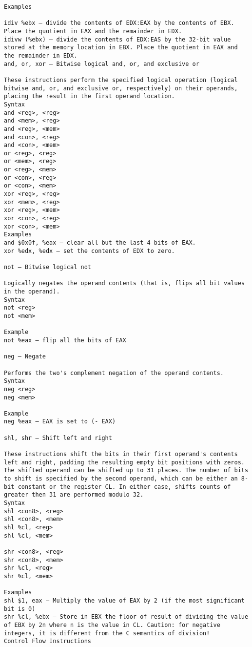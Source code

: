 \documentclass[10pt]{article}
\begin{document}
{\begin{multicols*}{5}
\begin{lstlisting}[breaklines=true,columns=fullflexible]
Examples

idiv %ebx — divide the contents of EDX:EAX by the contents of EBX. Place the quotient in EAX and the remainder in EDX.
idivw (%ebx) — divide the contents of EDX:EAS by the 32-bit value stored at the memory location in EBX. Place the quotient in EAX and the remainder in EDX.
and, or, xor — Bitwise logical and, or, and exclusive or

These instructions perform the specified logical operation (logical bitwise and, or, and exclusive or, respectively) on their operands, placing the result in the first operand location.
Syntax
and <reg>, <reg>
and <mem>, <reg>
and <reg>, <mem>
and <con>, <reg>
and <con>, <mem>
or <reg>, <reg>
or <mem>, <reg>
or <reg>, <mem>
or <con>, <reg>
or <con>, <mem>
xor <reg>, <reg>
xor <mem>, <reg>
xor <reg>, <mem>
xor <con>, <reg>
xor <con>, <mem>
Examples
and $0x0f, %eax — clear all but the last 4 bits of EAX.
xor %edx, %edx — set the contents of EDX to zero.

not — Bitwise logical not

Logically negates the operand contents (that is, flips all bit values in the operand).
Syntax
not <reg>
not <mem>

Example
not %eax — flip all the bits of EAX

neg — Negate

Performs the two's complement negation of the operand contents.
Syntax
neg <reg>
neg <mem>

Example
neg %eax — EAX is set to (- EAX)

shl, shr — Shift left and right

These instructions shift the bits in their first operand's contents left and right, padding the resulting empty bit positions with zeros. The shifted operand can be shifted up to 31 places. The number of bits to shift is specified by the second operand, which can be either an 8-bit constant or the register CL. In either case, shifts counts of greater then 31 are performed modulo 32.
Syntax
shl <con8>, <reg>
shl <con8>, <mem>
shl %cl, <reg>
shl %cl, <mem>

shr <con8>, <reg>
shr <con8>, <mem>
shr %cl, <reg>
shr %cl, <mem>

Examples
shl $1, eax — Multiply the value of EAX by 2 (if the most significant bit is 0)
shr %cl, %ebx — Store in EBX the floor of result of dividing the value of EBX by 2n where n is the value in CL. Caution: for negative integers, it is different from the C semantics of division!
Control Flow Instructions


\end{lstlisting}
\end{multicols*}}
\end{document}
